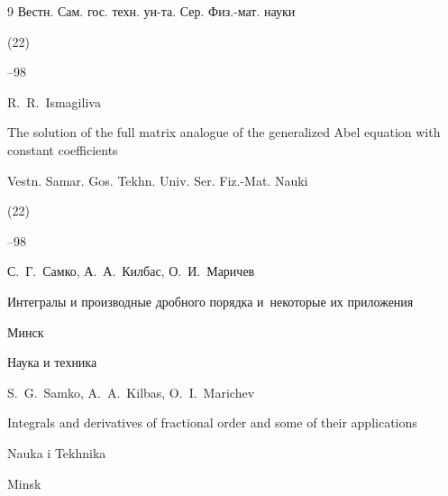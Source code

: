 \begin{thebibliography}{9}
\jour Вестн. Сам. гос. техн. ун-та. Сер. Физ.-мат. науки


(22)

--98


\misctransl

\by R.~R.~Ismagiliva

\paper The solution of the full matrix analogue of the generalized Abel equation with constant coefficients

\jour Vestn. Samar. Gos. Tekhn. Univ. Ser. Fiz.-Mat. Nauki


(22)

--98



\pagebreak




\by С.~Г.~Самко, А.~А.~Килбас, О.~И.~Маричев

\book Интегралы и производные дробного порядка и~некоторые их приложения

\publaddr Минск

\publ Наука и техника



\misctransl

\by S.~G.~Samko, A.~A.~Kilbas, O.~I.~Marichev 

\book Integrals and derivatives of fractional order and some of their applications

\publ Nauka i Tekhnika

\publaddr Minsk









\end{thebibliography}







\noindent

\hskip6.5cm \thedate \par\noindent

\hskip6.5cm\therevdate











\makeengtitlem







 \newpage

%


%

%

